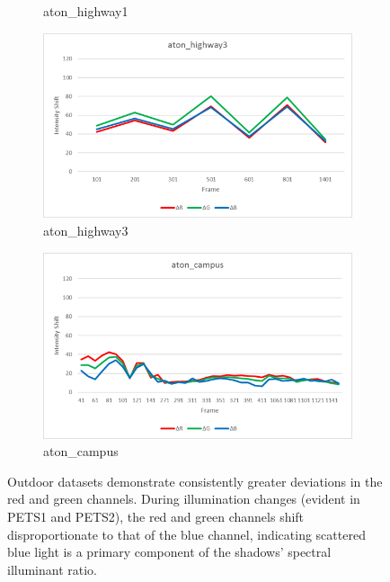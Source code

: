 \begin{figure}
\begin{subfigure}{.49\linewidth}
  \caption{aton\_highway1}
\end{subfigure}
\hfill
\begin{subfigure}{.49\linewidth}
  \includegraphics[width=1\linewidth]{figures/rgshift_highway3.jpg}
  \caption{aton\_highway3}
\end{subfigure}
\hfill
\begin{subfigure}{.7\linewidth}
  \includegraphics[width=1\linewidth]{figures/rgshift_campus.jpg}
  \caption{aton\_campus}
\end{subfigure}

\caption{Outdoor datasets demonstrate consistently greater deviations in the red and green channels. During illumination changes (evident in PETS1 and PETS2), the red and green channels shift disproportionate to that of the blue channel, indicating scattered blue light is a primary component of the shadows' spectral illuminant ratio.}
\label{fig:rgshift_outdoor}
\end{figure}

